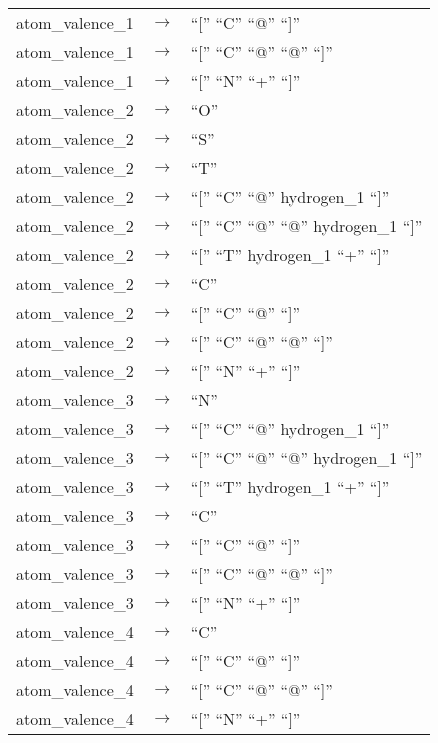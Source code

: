 \documentclass[../Document.tex]{subfiles}
\begin{document}
\begin{longtable}{m{} p{} p{}}
    atom\_valence\_1 & $\rightarrow$ & ``['' ``C'' ``@'' ``]'' \\
    atom\_valence\_1 & $\rightarrow$ & ``['' ``C'' ``@'' ``@'' ``]'' \\
    atom\_valence\_1 & $\rightarrow$ & ``['' ``N'' ``+'' ``]'' \\
    atom\_valence\_2 & $\rightarrow$ & ``O'' \\
    atom\_valence\_2 & $\rightarrow$ & ``S'' \\
    atom\_valence\_2 & $\rightarrow$ & ``T'' \\
    atom\_valence\_2 & $\rightarrow$ & ``['' ``C'' ``@'' hydrogen\_1 ``]'' \\
    atom\_valence\_2 & $\rightarrow$ & ``['' ``C'' ``@'' ``@'' hydrogen\_1 ``]'' \\
    atom\_valence\_2 & $\rightarrow$ & ``['' ``T'' hydrogen\_1 ``+'' ``]'' \\
    atom\_valence\_2 & $\rightarrow$ & ``C'' \\
    atom\_valence\_2 & $\rightarrow$ & ``['' ``C'' ``@'' ``]'' \\
    atom\_valence\_2 & $\rightarrow$ & ``['' ``C'' ``@'' ``@'' ``]'' \\
    atom\_valence\_2 & $\rightarrow$ & ``['' ``N'' ``+'' ``]'' \\
    atom\_valence\_3 & $\rightarrow$ & ``N'' \\
    atom\_valence\_3 & $\rightarrow$ & ``['' ``C'' ``@'' hydrogen\_1 ``]'' \\
    atom\_valence\_3 & $\rightarrow$ & ``['' ``C'' ``@'' ``@'' hydrogen\_1 ``]'' \\
    atom\_valence\_3 & $\rightarrow$ & ``['' ``T'' hydrogen\_1 ``+'' ``]'' \\
    atom\_valence\_3 & $\rightarrow$ & ``C'' \\
    atom\_valence\_3 & $\rightarrow$ & ``['' ``C'' ``@'' ``]'' \\
    atom\_valence\_3 & $\rightarrow$ & ``['' ``C'' ``@'' ``@'' ``]'' \\
    atom\_valence\_3 & $\rightarrow$ & ``['' ``N'' ``+'' ``]'' \\
    atom\_valence\_4 & $\rightarrow$ & ``C'' \\
    atom\_valence\_4 & $\rightarrow$ & ``['' ``C'' ``@'' ``]'' \\
    atom\_valence\_4 & $\rightarrow$ & ``['' ``C'' ``@'' ``@'' ``]'' \\
    atom\_valence\_4 & $\rightarrow$ & ``['' ``N'' ``+'' ``]'' \\

\end{longtable}
\end{document}
